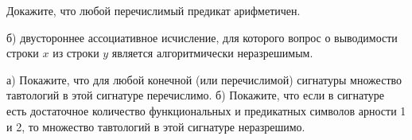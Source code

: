 \begin{ptask}{23}
	Докажите, что любой перечислимый предикат арифметичен. 
\end{ptask}

\begin{ptask}{24}
	б) двустороннее ассоциативное исчисление, для которого вопрос о выводимости строки $x$ из строки $y$ является алгоритмически
    неразрешимым.
\end{ptask}


\begin{ptask}{25}
	а) Покажите, что для любой конечной (или перечислимой) сигнатуры множество тавтологий в этой сигнатуре перечислимо. б)
    Покажите, что если в сигнатуре есть достаточное количество функциональных и предикатных символов арности 1 и 2, то множество
    тавтологий в этой сигнатуре неразрешимо.
\end{ptask}